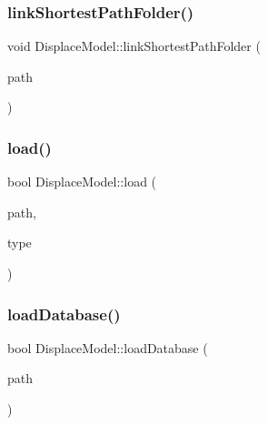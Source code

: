 \subsubsection{\texorpdfstring{linkShortestPathFolder()}{linkShortestPathFolder()}}
{\footnotesize\ttfamily void Displace\+Model\+::link\+Shortest\+Path\+Folder (\begin{DoxyParamCaption}\item[{Q\+String}]{path }\end{DoxyParamCaption})\hspace{0.3cm}{\ttfamily [inline]}}

\mbox{\label{class_displace_model_a50db8756e61d3c88daca0779c435191d}} 
\subsubsection{\texorpdfstring{load()}{load()}}
{\footnotesize\ttfamily bool Displace\+Model\+::load (\begin{DoxyParamCaption}\item[{Q\+String}]{path,  }\item[{\mbox{\hyperlink{class_displace_model_aa89dfe820a935c7ec328dd8fc5c7c8cf}{Model\+Type}}}]{type }\end{DoxyParamCaption})}

\mbox{\label{class_displace_model_aacd011e94f229ac288152fb3c84e3f6d}} 
\subsubsection{\texorpdfstring{loadDatabase()}{loadDatabase()}}
{\footnotesize\ttfamily bool Displace\+Model\+::load\+Database (\begin{DoxyParamCaption}\item[{Q\+String}]{path }\end{DoxyParamCaption})}

\mbox{\label{class_displace_model_a5e0ced25dcc4c4307ac3c78b3e1c43b5}} 
